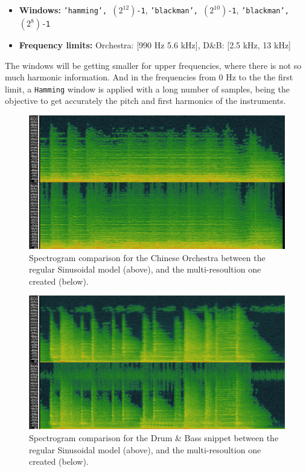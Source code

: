 \documentclass[11pt]{article}
\begin{document}
\begin{itemize}
	\item{\textbf{Windows:} \texttt{'hamming', $(2^{12})$-1}, \texttt{'blackman', $(2^{10})$-1}, \texttt{'blackman', $(2^8)$-1}} 
	\item{\textbf{Frequency limits:} Orchestra: [990 Hz 5.6 kHz], D\&B: [2.5 kHz, 13 kHz]}
\end{itemize}

The windows will be getting smaller for upper frequencies, where there is not so much harmonic information. And in the frequencies from 0 Hz to the  the first limit, a \texttt{Hamming} window is applied with a long number of samples, being the objective to get accurately the pitch and first harmonics of the instruments.

\begin{figure}[H]
  \includegraphics[width=\linewidth]{orch_out.jpg}
  \caption{Spectrogram comparison for the Chinese Orchestra between the regular Sinusoidal model (above), and the multi-resoultion one created (below).}
  \label{fig:orch_out}
\end{figure}

\begin{figure}[h]
  \includegraphics[width=\linewidth]{dbv_out.jpg}
  \caption{Spectrogram comparison for the Drum \& Bass snippet between the regular Sinusoidal model (above), and the multi-resoultion one created (below).}
  \label{fig:dbv_out}
\end{figure}
\end{document}
